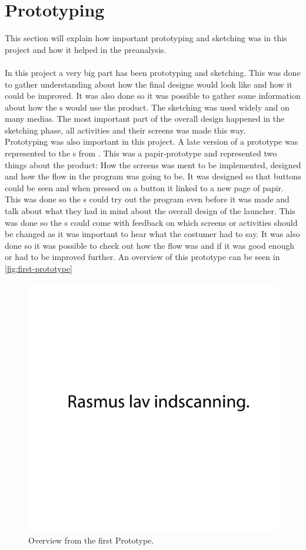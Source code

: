 \section{Prototyping}
This section will explain how important prototyping and sketching was in this project and how it helped in the preanalysis. \\\\
In this project a very big part has been prototyping and sketching. This was done to gather understanding about how the final designe would look like and how it could be improved. It was also done so it was possible to gather some information about how the \guardian{}s would use the product. The sketching was used widely and on many medias. The most important part of the overall design happened in the sketching phase, all activities and their screens was made this way. \\
Prototyping was also important in this project. A late version of a prototype was represented to the \guardian{}s from \egebakken{}. This was a papir-prototype and represented two things about the product: How the screens was ment to be implemented, designed and how the flow in the program was going to be. It was designed so that buttons could be seen and when pressed on a button it linked to a new page of papir. This was done so the \guardian{}s could try out the program even before it was made and talk about what they had in mind about the overall design of the launcher.
This was done so the \guardian{}s could come with feedback on which screens or activities should be changed as it was important to hear what the costumer had to say. It was also done so it was possible to check out how the flow was and if it was good enough or had to be improved further. An overview of this prototype can be seen in \autoref{fig:first-prototype}

\begin{figure}[h!]
	\centering
	\includegraphics[width=1\textwidth]{gfx/first-prototype.pdf}
	\caption{Overview from the first Prototype.}
	\label{fig:first-prototype}
\end{figure}

